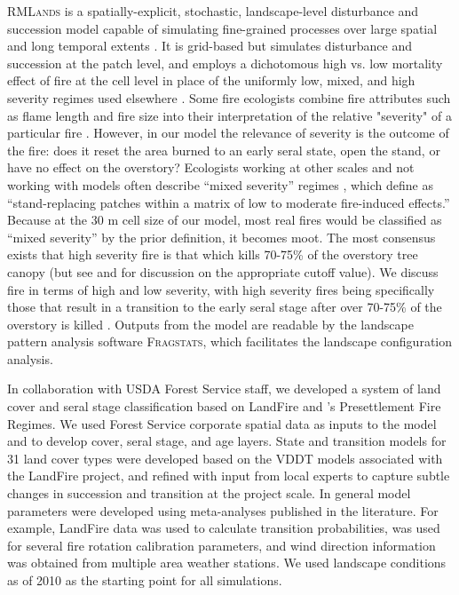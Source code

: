 \textsc{RMLands} is a spatially-explicit, stochastic, landscape-level disturbance and succession model capable of simulating fine-grained processes over large spatial and long temporal extents \citep{McGarigal2005}. It is grid-based but simulates disturbance and succession at the patch level, and employs a dichotomous high vs. low mortality effect of fire at the cell level in place of the uniformly low, mixed, and high severity regimes used elsewhere \citep{Mcgarigal2012}. Some fire ecologists combine fire attributes such as flame length and fire size into their interpretation of the relative "severity" of a particular fire \citep{Agee1993}. However, in our model the relevance of severity is the outcome of the fire: does it reset the area burned to an early seral state, open the stand, or have no effect on the overstory?  Ecologists working at other scales and not working with models often describe ``mixed severity'' regimes \citep[e.g.,]{Kane2013}, which \citet{Collins2010} define as ``stand-replacing patches within a matrix of low to moderate fire-induced effects.'' Because at the 30 m cell size of our model, most real fires would be classified as ``mixed severity'' by the prior definition, it becomes moot. The most consensus exists that high severity fire is that which kills 70-75\% of the overstory tree canopy (but see \citep{Fule2014} and \citep{Mallek2013} for discussion on the appropriate cutoff value). We discuss fire in terms of high and low severity, with high severity fires being specifically those that result in a transition to the early seral stage after over 70-75\% of the overstory is killed \citep{Miller2009, Baker2014}. Outputs from the model are readable by the landscape pattern analysis software \textsc{Fragstats}, which facilitates the landscape configuration analysis. 

In collaboration with USDA Forest Service staff, we developed a system of land cover and seral stage classification based on LandFire and \citet{VandeWater2011}'s Presettlement Fire Regimes. We used Forest Service corporate spatial data as inputs to the model and to develop cover, seral stage, and age layers. State and transition models for 31 land cover types were developed based on the VDDT models associated with the LandFire project, and refined with input from local experts to capture subtle changes in succession and transition at the project scale. In general model parameters were developed using meta-analyses published in the literature. For example, LandFire data was used to calculate transition probabilities, \citet{Mallek2013} was used for several fire rotation calibration parameters, and wind direction information was obtained from multiple area weather stations. We used landscape conditions as of 2010 as the starting point for all simulations. 

